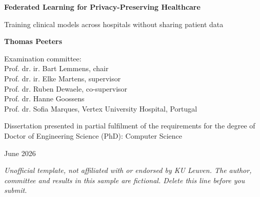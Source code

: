 \begin{titlepage}
\raggedright
{\Large\bfseries Federated Learning for Privacy-Preserving Healthcare\par}
\vspace{0.1in}
{\large Training clinical models across hospitals without sharing patient data\par}
\vspace{0.3in}
{\large\bfseries Thomas Peeters\par}
\vspace{0.9in}
\begin{minipage}[t]{0.52\linewidth}\small
Examination committee:\\
Prof. dr. ir. Bart Lemmens, chair\\
Prof. dr. ir. Elke Martens, supervisor\\
Prof. dr. Ruben Dewaele, co-supervisor\\
Prof. dr. Hanne Goossens\\
Prof. dr. Sofia Marques, Vertex University Hospital, Portugal
\end{minipage}\hfill
\begin{minipage}[t]{0.44\linewidth}\small
Dissertation presented in partial fulfilment of the requirements for the degree of
Doctor of Engineering Science (PhD): Computer Science
\end{minipage}\par
\vfill
\centering June 2026\par
\vspace{0.2in}
{\scriptsize {\footnotesize\itshape Unofficial template, not affiliated with or endorsed by KU Leuven. The author, committee and results in this sample are fictional. Delete this line before you submit.}}
\end{titlepage}
